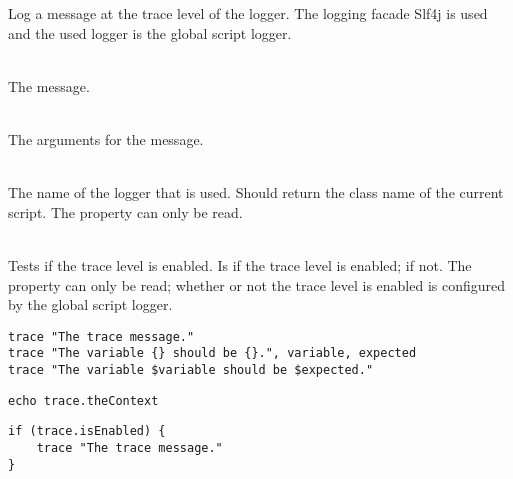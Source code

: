 %


Log a message at the trace level of the logger.
The logging facade Slf4j\cite{slf4j13} is used and the used logger is
the global script logger.

\begin{asparadesc}
%
\item[\code{message}] \hfill \\
The message.
%
\item[\code{args}] \hfill \\
The arguments for the message.
%
\item[\code{theContext}] \hfill \\
The name of the logger that is used. Should return the class name of the current
script. The property can only be read.
%
\item[\code{isEnabled}] \hfill \\
Tests if the trace level is enabled. Is  if the trace level is enabled;
 if not. The property can only be read; whether or not the trace
level is enabled is configured by the global script logger.
%
\end{asparadesc}

\begin{lstlisting}[style=Groovybash, label={lst:example_trace1}, title={%
Outputs a trace logging message with arguments.}]
trace "The trace message."
trace "The variable {} should be {}.", variable, expected
trace "The variable $variable should be $expected."
\end{lstlisting}

\begin{lstlisting}[style=Groovybash, label={lst:example_trace2}, title={%
Prints the name of the current logger.}]
echo trace.theContext
\end{lstlisting}

\begin{lstlisting}[style=Groovybash, label={lst:example_trace3}, title={%
Tests if the trace level is enabled.}]
if (trace.isEnabled) {
    trace "The trace message."
}
\end{lstlisting}

